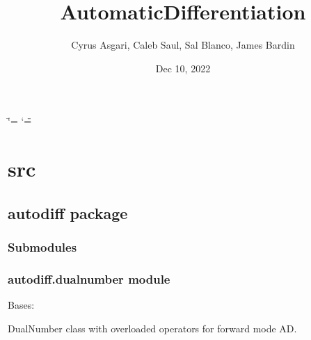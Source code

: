 \documentclass[letterpaper,10pt,english]{sphinxmanual}
\title{AutomaticDifferentiation}
\date{Dec 10, 2022}
\author{Cyrus Asgari, Caleb Saul, Sal Blanco, James Bardin}
\begin{document}
\ifdefined\shorthandoff
  \ifnum\catcode`\=\string=\active\shorthandoff{=}\fi
  \ifnum\catcode`\"=\active{}\fi
\fi

\pagestyle{empty}
\sphinxmaketitle
\pagestyle{plain}
\sphinxtableofcontents
\pagestyle{normal}
\label{\detokenize{index::doc}}


\sphinxstepscope


\chapter{src}
\label{\detokenize{modules:src}}\label{\detokenize{modules::doc}}
\sphinxstepscope


\section{autodiff package}
\label{\detokenize{autodiff:autodiff-package}}\label{\detokenize{autodiff::doc}}

\subsection{Submodules}
\label{\detokenize{autodiff:submodules}}

\subsection{autodiff.dualnumber module}
\label{\detokenize{autodiff:module-autodiff.dualnumber}}\label{\detokenize{autodiff:autodiff-dualnumber-module}}

\begin{fulllineitems}
\label{\detokenize{autodiff:autodiff.dualnumber.DualNumber}}
\pysigstartsignatures
{}
\pysigstopsignatures
\sphinxAtStartPar
Bases: 

\sphinxAtStartPar
DualNumber class with overloaded operators for forward mode AD.

\end{fulllineitems}
\end{document}
